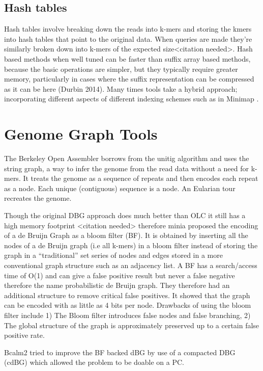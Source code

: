\documentclass[11pt]{article}
\begin{document}
\subsection{Hash tables}
\label{sec:org400a385}
Hash tables involve breaking down the reads into k-mers and storing the kmers
into hash tables that point to the original data. When queries are made they’re 
similarly broken down into k-mers of the expected size<citation needed>.
Hash based methods when well tuned can be faster than suffix array based 
methods, because the basic operations are simpler, but they typically require
greater memory, particularly in cases where the suffix representation can be
compressed as it can be here (Durbin 2014).
Many times tools take a hybrid approach; incorporating different aspects of
different indexing schemes such as in Minimap
\cite{liDesignConstructionReference2020}. 
\section{Genome Graph Tools}
\label{sec:orgfc2affc}
The Berkeley Open Assembler \cite{myersFragmentAssemblyString2005} borrows 
from the unitig algorithm and uses the string graph, a way to infer the genome
from the read data without a need for k-mers.
It treats the genome as a sequence of repeats and then encodes each repeat as 
a node. Each unique (contiguous) sequence is a node. An Eularian tour recreates
the genome.

Though the original DBG approach does much better than OLC it still has a high 
memory footprint <citation needed> therefore minia
\cite{chikhiSpaceefficientExactBruijn2013} proposed the encoding of a 
de Bruijn Graph as a bloom filter (BF). It is obtained by inserting all the
nodes of a de Bruijn graph (i.e all k-mers) in a bloom filter instead of storing 
the graph in a “traditional” set series of nodes and edges stored in a more
conventional graph structure such as an adjacency list. 
A BF has a search/access time of O(1) and can give a false positive result but
never a false negative therefore the name probabilistic de Bruijn graph.  
They therefore had an additional structure to remove critical false positives.
It showed that the graph can be encoded with as little as 4 bits per node.
Drawbacks of using the bloom filter include 1) The Bloom filter introduces false
nodes and false branching, 2) The global structure of the graph is approximately
preserved up to a certain false positive rate.

Bcalm2 \cite{chikhiCompactingBruijnGraphs2016} tried to improve the BF backed dBG 
by use of a compacted DBG (cdBG) which allowed the problem to be doable on a PC.
\end{document}
